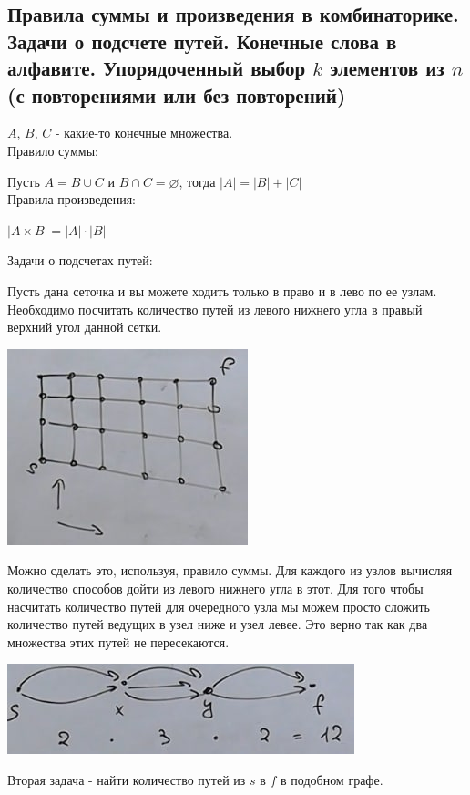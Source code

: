 \subsection{Правила суммы и произведения в комбинаторике. Задачи о подсчете путей. Конечные слова в алфавите. Упорядоченный выбор $k$ элементов из $n$ (с повторениями или без повторений)}

$A$, $B$, $C$ - какие-то конечные множества.\\
Правило суммы:

Пусть $A = B \cup C$ и $B \cap C = \varnothing$, тогда $|A| = |B| + |C|$\\
Правила произведения:

$|A \times B| = |A| \cdot |B|$

Задачи о подсчетах путей:

Пусть дана сеточка и вы можете ходить только в право и в лево по ее узлам. Необходимо посчитать количество путей из левого нижнего угла в правый верхний угол данной сетки.

\includegraphics[scale=1.5]{definitions/images/first-patch.jpg}

Можно сделать это, используя, правило суммы. Для каждого из узлов вычисляя количество способов дойти из левого нижнего угла в этот. Для того чтобы насчитать количество путей для очередного узла мы можем просто сложить количество путей ведущих в узел ниже и узел левее. Это верно так как два множества этих путей не пересекаются.

\includegraphics[scale=1.5]{definitions/images/second-patch.jpg}

Вторая задача - найти количество путей из $s$ в $f$ в подобном графе.


